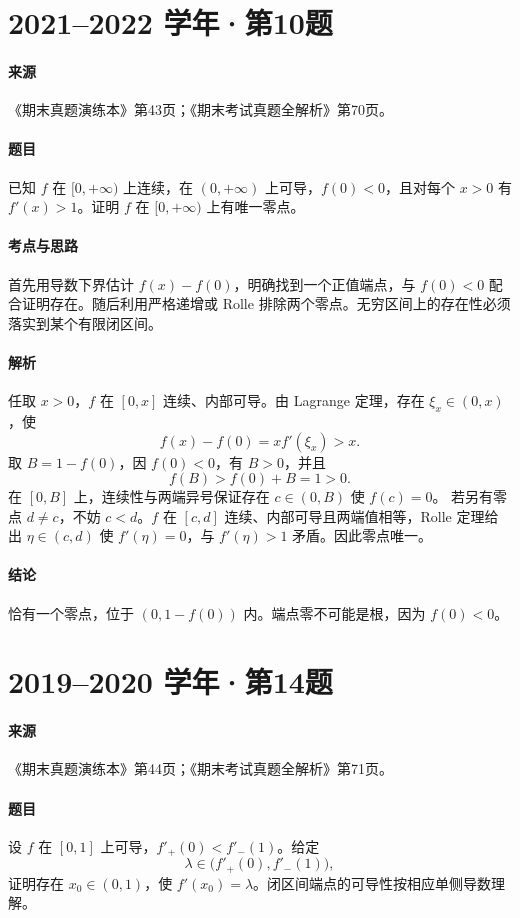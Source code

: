 \documentclass[UTF8,fontset=fandol,12pt,oneside,openany]{ctexrep}
\theoremstyle{definition}
\begin{document}
\par\addvspace{18pt}\noindent\begin{minipage}{\linewidth}
\section{2021--2022 学年·第10题}
\paragraph{来源}《期末真题演练本》第43页；《期末考试真题全解析》第70页。
\paragraph{题目}
已知 $f$ 在 $[0,+\infty)$ 上连续，在 $(0,+\infty)$ 上可导，$f(0)<0$，且对每个 $x>0$ 有 $f'(x)>1$。证明 $f$ 在 $[0,+\infty)$ 上有唯一零点。
\end{minipage}\par
\paragraph{考点与思路}
首先用导数下界估计 $f(x)-f(0)$，明确找到一个正值端点，与 $f(0)<0$ 配合证明存在。随后利用严格递增或 Rolle 排除两个零点。无穷区间上的存在性必须落实到某个有限闭区间。
\paragraph{解析}
任取 $x>0$，$f$ 在 $[0,x]$ 连续、内部可导。由 Lagrange 定理，存在 $\xi_x\in(0,x)$，使
\[
f(x)-f(0)=xf'(\xi_x)>x.
\]
取 $B=1-f(0)$，因 $f(0)<0$，有 $B>0$，并且
\[
f(B)>f(0)+B=1>0.
\]
在 $[0,B]$ 上，连续性与两端异号保证存在 $c\in(0,B)$ 使 $f(c)=0$。
若另有零点 $d\ne c$，不妨 $c<d$。$f$ 在 $[c,d]$ 连续、内部可导且两端值相等，Rolle 定理给出 $\eta\in(c,d)$ 使 $f'(\eta)=0$，与 $f'(\eta)>1$ 矛盾。因此零点唯一。
\paragraph{结论}恰有一个零点，位于 $(0,1-f(0))$ 内。端点零不可能是根，因为 $f(0)<0$。

\par\addvspace{18pt}\noindent\begin{minipage}{\linewidth}
\section{2019--2020 学年·第14题}
\paragraph{来源}《期末真题演练本》第44页；《期末考试真题全解析》第71页。
\paragraph{题目}
设 $f$ 在 $[0,1]$ 上可导，$f'_+(0)<f'_-(1)$。给定
\[
\lambda\in\bigl(f'_+(0),f'_-(1)\bigr),
\]
证明存在 $x_0\in(0,1)$，使 $f'(x_0)=\lambda$。闭区间端点的可导性按相应单侧导数理解。
\end{minipage}\par
\end{document}
